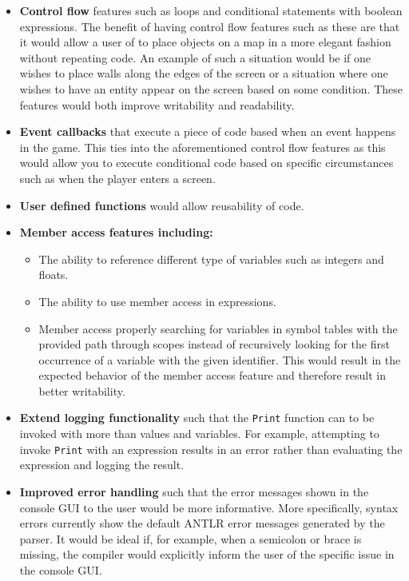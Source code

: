 \begin{itemize}
    \item
      \textbf{Control flow} features such as loops and conditional statements with boolean expressions. The benefit of having control flow features such as these are that it would allow a user of \dazel{} to place objects on a map in a more elegant fashion without repeating code. An example of such a situation would be if one wishes to place walls along the edges of the screen or a situation where one wishes to have an entity appear on the screen based on some condition. These features would both improve writability and readability.
    \item
      \textbf{Event callbacks} that execute a piece of code based when an event happens in the game. This ties into the aforementioned control flow features as this would allow you to execute conditional code based on specific circumstances such as when the player enters a screen. 
    \item
      \textbf{User defined functions} would allow reusability of code. 
    \item
      \textbf{Member access features including:}
      \begin{itemize}
        \item
            The ability to reference different type of variables such as integers and floats.
        \item
            The ability to use member access in expressions.    
        \item
            Member access properly searching for variables in symbol tables with the provided path through scopes instead of recursively looking for the first occurrence of a variable with the given identifier. This would result in the expected behavior of the member access feature and therefore result in better writability.
      \end{itemize}
      \item
        \textbf{Extend logging functionality} such that the \texttt{Print} function can to be invoked with more than values and variables. For example, attempting to invoke \texttt{Print} with an expression results in an error rather than evaluating the expression and logging the result.
    \item
      \textbf{Improved error handling} such that the error messages shown in the console GUI to the user would be more informative. More specifically, syntax errors currently show the default ANTLR error messages generated by the parser. It would be ideal if, for example, when a semicolon or brace is missing, the compiler would explicitly inform the user of the specific issue in the console GUI.
\end{itemize}

